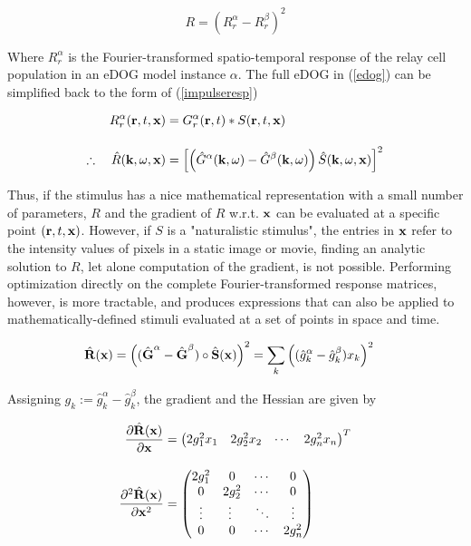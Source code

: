 \documentclass{article}
\newcommand{\vect}[1]{\textbf{\textrm{#1}}}
\newcommand{\pd}[2]{\frac{\partial {#1}}{\partial {#2}}}
\newcommand{\pdd}[2]{\frac{\partial^2 {#1}}{\partial {#2}}}
\begin{document}
\begin{equation}
	R = (R_{r}^{\alpha} - R_{r}^{\beta})^2
\end{equation}

Where $R_{r}^{\alpha}$ is the Fourier-transformed spatio-temporal response of the relay cell population in an eDOG model instance $\alpha$. 
The full eDOG in (\ref{edog}) can be simplified back to the form of (\ref{impulseresp})

\begin{align}
	R_{r}^{\alpha}(\vect{r},t,\vect{x}) & = G_{r}^{\alpha}(\vect{r},t)*S(\vect{r},t,\vect{x}) 
	\nonumber \\[1em]
	\therefore \quad \hat{R}(\vect{k}, \omega, \vect{x}) & = 
	\left[ \left(\hat{G}^{\alpha}(\vect{k}, \omega) - \hat{G}^{\beta}(\vect{k}, \omega)\right)
	\hat{S}(\vect{k}, \omega, \vect{x}) \right]^2 \label{objfunc}
\end{align}

Thus, if the stimulus has a nice mathematical representation with a small number of parameters, $R$ and the gradient of $R$ w.r.t. $\vect{x}$ can be evaluated at a specific point $(\vect{r},t,\vect{x})$.
However, if $S$ is a "naturalistic stimulus", the entries in $\vect{x}$ refer to the intensity values of pixels in a static image or movie, finding an analytic solution to $R$, let alone computation of the gradient, is not possible.
Performing optimization directly on the complete Fourier-transformed response matrices, however, is more tractable, and produces expressions that can also be applied to mathematically-defined stimuli evaluated at a set of points in space and time.

\begin{align} \label{objmat}
	\hat{\vect{R}}(\vect{x}) & = \left( (\hat{\vect{G}}^\alpha - \hat{\vect{G}}^\beta) \circ 
						   		  \hat{\vect{S}}(\vect{x}) \right)^2 = 
						   		  \sum_{k}{\left( (\hat{g}_k^{\alpha} - 
						   		  \hat{g}_k^{\beta}) x_k \right)^2}
\end{align}

Assigning $g_k := \hat{g}_k^\alpha - \hat{g}_k^\beta$, the gradient and the Hessian are given by

\begin{align}
	\pd{\hat{\vect{R}}(\vect{x})}{\vect{x}} & = 
	\begin{pmatrix}
		2 g_1^2 x_1 & 2 g_2^2 x_2 & \cdots & 2 g_n^2 x_n
	\end{pmatrix}^{T} \label{objgradient} \\[1em]
	\pdd{\hat{\vect{R}}(\vect{x})}{\vect{x}^2} & =
	\begin{pmatrix}
		2 g_1^2 & 0 & \cdots & 0 \\
		0 & 2 g_2^2 & \cdots & 0 \\
		\vdots & \vdots\ & \ddots & \vdots \\
		0 & 0 & \cdots & 2g_n^2
	\end{pmatrix} \label{objhessian}
\end{align}
\end{document}
